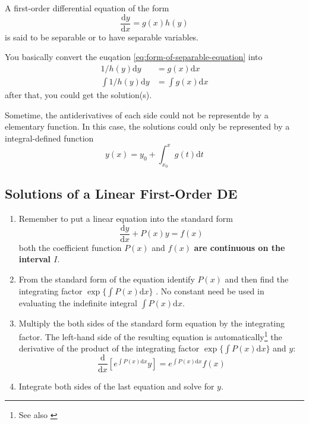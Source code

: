 \documentclass{beaulivre}
\begin{document}
\begin{definition}
    A first-order differential equation of the form
    \begin{equation}\label{eq:form-of-separable-equation}
        \dfrac{\mathrm{d}y}{\mathrm{d}x} = g(x)h(y)
    \end{equation}
    is said to be separable or to have separable variables.
\end{definition}

You basically convert the euqation \ref{eq:form-of-separable-equation} into
\begin{align*}
    1/h(y) \mathrm{d}y &= g(x) \mathrm{d}x\\
    \int 1/h(y) \mathrm{d}y &= \int g(x) \mathrm{d}x
\end{align*}
after that, you could get the solution(s).

Sometime, the antiderivatives of each side could not be 
representde by a elementary function. 
In this case, the solutions could only be represented by a 
integral-defined function
\[
    y(x) = y_0 + \int_{x_0}^{x} g(t) \mathrm{d}t
\]

\subsection{Solutions of a Linear First-Order DE}

\begin{enumerate}
    \item Remember to put a linear equation into the standard form
        \begin{equation}\label{eq:standard-form-of-linear-ODE}
            \dfrac{\mathrm{d}y}{\mathrm{d}x} + P(x) y = f(x)
        \end{equation}
        both the coefficient function $P(x)$ and $f(x)$
        \textbf{are continuous on the interval $I$}.
    \item 
        From the standard form of the equation 
        identify $P(x)$ and then find the
        integrating factor
        $\exp\{\int P(x) \mathrm{d}x\}$
        . 
        No constant need be used in evaluating the
        indefinite integral $\int P(x) \mathrm{d}x$.
    \item 
        Multiply the both sides of the standard form equation by the integrating
        factor. The left-hand side of the resulting equation 
        is automatically\footnote{See also \cite[page 55]{fcde}} the
        derivative of the product of the integrating factor
        $\exp\{\int P(x) \mathrm{d}x\}$
        and $y$:
        \begin{equation}
            \dfrac{\mathrm{d}}{\mathrm{d}x}
            \left[
                e^{\int P(x) \mathrm{d}x} y
            \right]
            =
            e^{\int P(x) \mathrm{d}x} f(x)
        \end{equation}
    \item 
        Integrate both sides of the last equation and solve for $y$\cite[page 56]{fcde}.
\end{enumerate}
\end{document}
